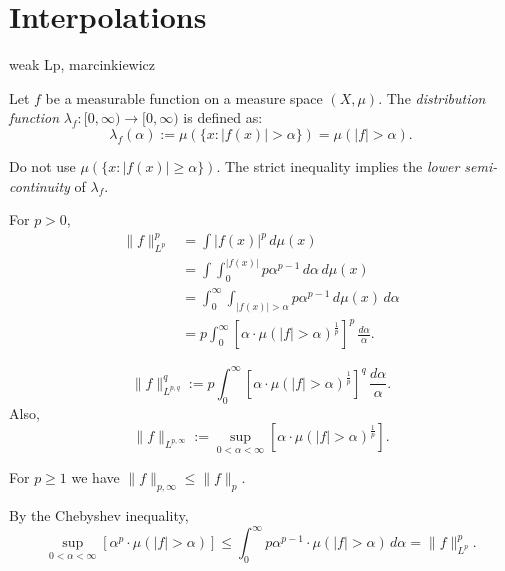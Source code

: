 \documentclass{../../large}
\begin{document}
\begin{prb}
\end{prb}

\begin{prb}
\end{prb}

\begin{prb}
\end{prb}



\section{Interpolations}
weak Lp, marcinkiewicz

\begin{defn}
Let $f$ be a measurable function on a measure space $(X,\mu)$.
The \emph{distribution function} $\lambda_f:[0,\infty)\to [0,\infty)$ is defined as:
\[\lambda_f(\alpha):=\mu(\{x:|f(x)|>\alpha\})=\mu(|f|>\alpha).\]
\end{defn}

Do not use $\mu(\{x:|f(x)|\ge\alpha\})$.
The strict inequality implies the \emph{lower semi-continuity} of $\lambda_f$.


For $p>0$,
\begin{align*}
\|f\|_{L^p}^p
&=\int|f(x)|^p\,d\mu(x)\\
&=\int\int_0^{|f(x)|}p\alpha^{p-1}\,d\alpha\,d\mu(x)\\
&=\int_0^\infty\int_{|f(x)|>\alpha}p\alpha^{p-1}\,d\mu(x)\,d\alpha\\
&=p\int_0^\infty\left[\alpha\cdot\mu(|f|>\alpha)^\frac1p\right]^p\,\frac{d\alpha}\alpha.
\end{align*}

\begin{defn}
\[\|f\|_{L^{p,q}}^q:=p\int_0^\infty\left[\alpha\cdot\mu(|f|>\alpha)^\frac1p\right]^q\,\frac{d\alpha}\alpha.\]
Also,
\[\|f\|_{L^{p,\infty}}:=\sup_{0<\alpha<\infty}\left[\alpha\cdot\mu(|f|>\alpha)^\frac1p\right].\]
\end{defn}
\begin{thm}
For $p\ge1$ we have $\|f\|_{p,\infty}\le\|f\|_p$.
\end{thm}
\begin{pf}
By the Chebyshev inequality,
\[\sup_{0<\alpha<\infty}\left[\alpha^p\cdot\mu(|f|>\alpha)\right]\le\int_0^\infty p\alpha^{p-1}\cdot\mu(|f|>\alpha)\,d\alpha=\|f\|_{L^p}^p.\]

\end{pf}
\end{document}
